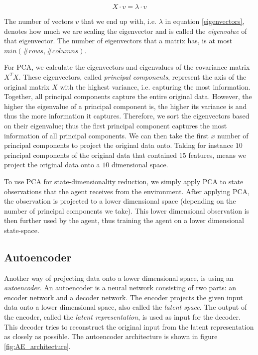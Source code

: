 \begin{equation}
\label{eigenvectors}
X \cdot v = \lambda \cdot v
\end{equation}

The number of vectors $v$ that we end up with, i.e. $\lambda$ in equation \ref{eigenvectors}, denotes how much we are scaling the eigenvector and is called the \emph{eigenvalue} of that eigenvector. The number of eigenvectors that a matrix has, is at most $min(\#rows, \#columns)$. 

For PCA, we calculate the eigenvectors and eigenvalues of the covariance matrix $X^TX$. These eigenvectors, called \emph{principal components}, represent the axis of the original matrix $X$ with the highest variance, i.e. capturing the most information. Together, all principal components capture the entire original data. However, the higher the eigenvalue of a principal component is, the higher its variance is and thus the more information it captures. Therefore, we sort the eigenvectors based on their eigenvalue; thus the first principal component captures the most information of all principal components. We can then take the first $x$ number of principal components to project the original data onto. Taking for instance $10$ principal components of the original data that contained $15$ features, means we project the original data onto a $10$ dimensional space.

To use PCA for state-dimensionality reduction, we simply apply PCA to state observations that the agent receives from the environment. After applying PCA, the observation is projected to a lower dimensional space (depending on the number of principal components we take). This lower dimensional observation is then further used by the agent, thus training the agent on a lower dimensional state-space.

\subsection{Autoencoder}\label{pl-ae}
Another way of projecting data onto a lower dimensional space, is using an \emph{autoencoder}\cite{AE_general}. An autoencoder is a neural network consisting of two parts: an encoder network and a decoder network. The encoder projects the given input data onto a lower dimensional space, also called the \emph{latent space}. The output of the encoder, called the \emph{latent representation}, is used as input for the decoder. This decoder tries to reconstruct the original input from the latent representation as closely as possible. The autoencoder architecture is shown in figure \ref{fig:AE_architecture}.

